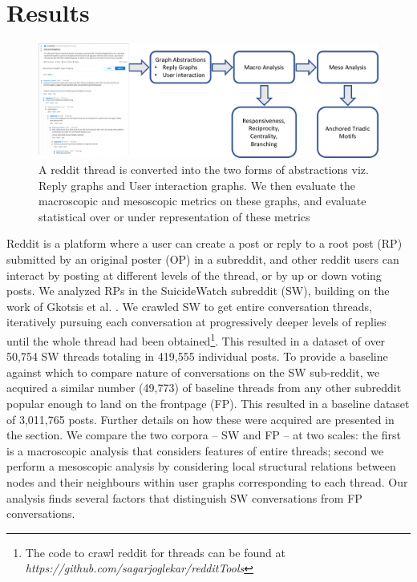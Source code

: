 \vspace{-7mm}
\section{Results}
\begin{figure}[!ht]
    \centering
    \includegraphics[width=0.7\linewidth]{Figures/Pipeline.pdf}
    \caption{A reddit thread is converted into the two forms of abstractions viz. Reply graphs and User interaction graphs. We then evaluate the macroscopic and mesoscopic metrics on these graphs, and evaluate statistical over or under representation of these metrics}
    \label{fig:pipeline}
\end{figure}

Reddit is a platform where a user can create a post or reply to a root post (RP) submitted by an original poster (OP) in a subreddit, and other reddit users can interact by posting at different levels of the thread, or by up or down voting posts. We analyzed RPs in the SuicideWatch subreddit (SW), building on the work of Gkotsis et al. \cite{gkotsis2017characterisation}.
We crawled SW to get entire conversation threads,
iteratively pursuing each conversation at progressively deeper levels of replies until the whole thread had been obtained\footnote{The code to crawl reddit for threads can be found at \textit{https://github.com/sagarjoglekar/redditTools}}. This resulted in a dataset of over 50,754 SW threads totaling in 419,555 individual posts. 
To provide a baseline against which to compare nature of conversations on the SW sub-reddit, we acquired a similar number (49,773) of baseline threads from any other subreddit popular enough to land on the frontpage (FP). This resulted in a baseline dataset of 3,011,765 posts. Further details on how these were acquired are presented in the  section. We compare the two corpora -- SW and FP -- at two scales: the first is a macroscopic analysis that considers features of entire threads; second we perform a mesoscopic analysis by considering local structural relations between nodes and their neighbours within user graphs corresponding to each thread. Our analysis finds several factors that distinguish SW conversations from FP conversations. %
